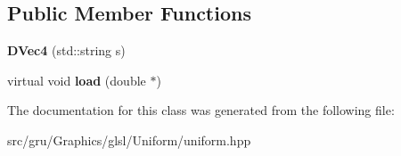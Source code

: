 \subsection*{\-Public \-Member \-Functions}
\begin{DoxyCompactItemize}
\item 
\hypertarget{classglutpp_1_1glsl_1_1Uniform_1_1Scalar_1_1DVec4_aa26da7cb993705ed39c302dca3647970}{{\bfseries \-D\-Vec4} (std\-::string s)}\label{classglutpp_1_1glsl_1_1Uniform_1_1Scalar_1_1DVec4_aa26da7cb993705ed39c302dca3647970}

\item 
\hypertarget{classglutpp_1_1glsl_1_1Uniform_1_1Scalar_1_1DVec4_a81c1484ced560bf720c093c0fa5c9081}{virtual void {\bfseries load} (double $\ast$)}\label{classglutpp_1_1glsl_1_1Uniform_1_1Scalar_1_1DVec4_a81c1484ced560bf720c093c0fa5c9081}

\end{DoxyCompactItemize}


\-The documentation for this class was generated from the following file\-:\begin{DoxyCompactItemize}
\item 
src/gru/\-Graphics/glsl/\-Uniform/uniform.\-hpp\end{DoxyCompactItemize}
